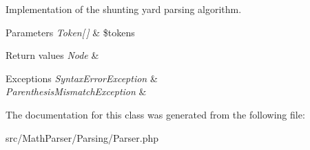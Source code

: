 Implementation of the shunting yard parsing algorithm. 


\begin{DoxyParams}{Parameters}
{\em Token\mbox{[}$\,$\mbox{]}} & \$tokens \\
\hline
\end{DoxyParams}

\begin{DoxyRetVals}{Return values}
{\em Node} & \\
\hline
\end{DoxyRetVals}

\begin{DoxyExceptions}{Exceptions}
{\em Syntax\-Error\-Exception} & \\
\hline
{\em Parenthesis\-Mismatch\-Exception} & \\
\hline
\end{DoxyExceptions}


The documentation for this class was generated from the following file\-:\begin{DoxyCompactItemize}
\item 
src/\-Math\-Parser/\-Parsing/Parser.\-php\end{DoxyCompactItemize}
